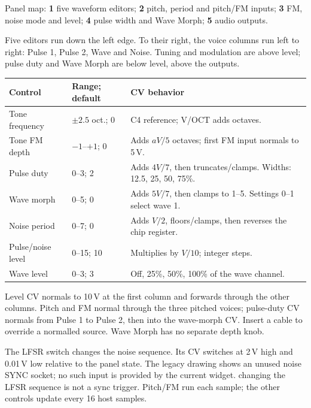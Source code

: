 Panel map: \textbf{1} five waveform editors;
\textbf{2} pitch, period and pitch/FM inputs;
\textbf{3} FM, noise mode and level;
\textbf{4} pulse width and Wave Morph;
\textbf{5} audio outputs.

Five editors run down the left edge. To their right, the voice columns run
left to right: Pulse 1, Pulse 2, Wave and Noise. Tuning and modulation are
above level; pulse duty and Wave Morph are below level, above the outputs.

\begin{tabularx}{\textwidth}{@{}l l X@{}}
\toprule Control & Range; default & CV behavior \\\midrule
Tone frequency & $\pm2.5$ oct.; 0 & C4 reference; V/OCT adds octaves. \\
Tone FM depth & $-1$--$+1$; 0 & Adds $aV/5$ octaves; first FM input normals to 5\,V. \\
Pulse duty & 0--3; 2 & Adds $4V/7$, then truncates/clamps. Widths: 12.5, 25, 50, 75\%. \\
Wave morph & 0--5; 0 & Adds $5V/7$, then clamps to 1--5. Settings 0--1 select wave 1. \\
Noise period & 0--7; 0 & Adds $V/2$, floors/clamps, then reverses the chip register. \\
Pulse/noise level & 0--15; 10 & Multiplies by $V/10$; integer steps. \\
Wave level & 0--3; 3 & Off, 25\%, 50\%, 100\% of the wave channel. \\
\bottomrule
\end{tabularx}

Level CV normals to 10\,V at the first column and forwards through the other
columns. Pitch and FM normal through the three pitched voices; pulse-duty
CV normals from Pulse 1 to Pulse 2, then into the wave-morph CV. Insert a
cable to override a normalled source. Wave Morph has no separate depth knob.

The LFSR switch changes the noise sequence. Its CV switches at 2\,V high and
0.01\,V low relative to the panel state. The legacy drawing shows an unused noise SYNC socket; no such input is
provided by the current widget.
changing the LFSR sequence is not a sync trigger. Pitch/FM run each sample;
the other controls update every 16 host samples.
